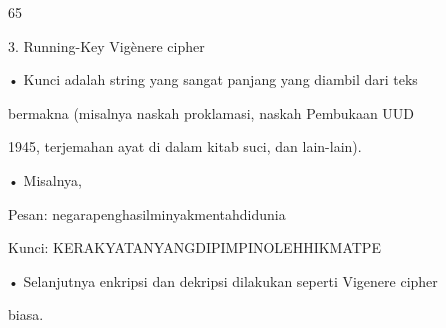 \documentclass{article}
\begin{document}

65

3. Running-Key Vigènere cipher

• Kunci adalah string yang sangat panjang yang diambil dari teks 

bermakna (misalnya naskah proklamasi, naskah Pembukaan UUD 

1945, terjemahan ayat di dalam kitab suci, dan lain-lain). 

• Misalnya, 

 Pesan: negarapenghasilminyakmentahdidunia 

 Kunci:  KERAKYATANYANGDIPIMPINOLEHHIKMATPE 

• Selanjutnya enkripsi dan dekripsi dilakukan seperti Vigenere cipher 

biasa.
\end{document}
